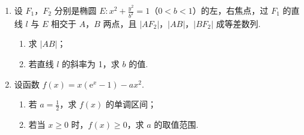 \begin{description}
\begin{enumerate}[leftmargin=5pt]
\begin{enumerate}
\item 估计该地区老年人中，需要志愿者提供帮助的老年人的比例；
\item 能否有 \(99\%\) 的把握认为该地区的老年人是否需要志愿者提供帮助与性别有关？
\item 根据（2）的结论，能否提供更好的调查方法来估计该地区老年人，需要志愿者帮助的老年人的比例？说明理由.
\end{enumerate}

附：
\begin{center}
\begin{tabular}{c c c c}
\(P(K^2\geqslant k)\) & \(0.050\) & \(0.010\) & \(0.001\) \\
\hline
\(k\) & \(3.841\) & \(6.635\) & \(10.828\)
\end{tabular}
\end{center}

\(\displaystyle K^{2} = \frac{n(ad - bc)^{2}}{(a + b)(c + d)(a + c)(b + d)}\)

        \item 设 \(F_{1}\)，\(F_{2}\) 分别是椭圆 \(E: x^{2} + \frac{y^{2}}{b^{2}} = 1\)（\(0 < b < 1\)）的左，右焦点，过 \(F_{1}\) 的直线 \(l\) 与 \(E\) 相交于 \(A\)，\(B\) 两点，且 \(|AF_{2}|\)，\(|AB|\)，\(|BF_{2}|\) 成等差数列.

\begin{enumerate}
\item 求 \(|AB|\)；
\item 若直线 \(l\) 的斜率为 1，求 \(b\) 的值.
\end{enumerate}

        \item 设函数 \( f(x) = x({\mathrm{e}}^x - 1) - ax^2 \).

\begin{enumerate}
\item 若 \(a = \frac{1}{2}\)，求 \(f(x)\) 的单调区间；
\item 若当 \(x \geqslant 0\) 时，\(f(x) \geqslant 0\)，求 \(a\) 的取值范围.
\end{enumerate}

    \end{enumerate}

\end{description}

